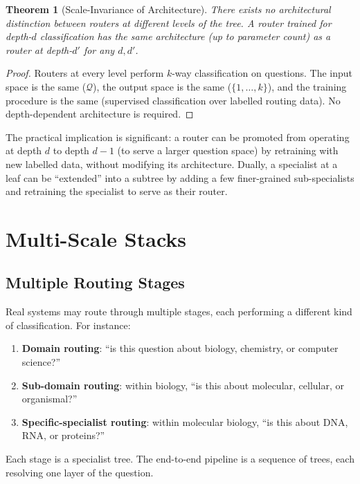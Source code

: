 \documentclass[11pt,twocolumn,a4paper]{article}
\newtheorem{theorem}{Theorem}[section]
\theoremstyle{definition}
\theoremstyle{remark}
\newcommand{\Qc}{\mathcal{Q}}
\begin{document}
\begin{theorem}[Scale-Invariance of Architecture]
\label{thm:scale-inv}
There exists no architectural distinction between routers at different levels of the tree. A router trained for depth-$d$ classification has the same architecture (up to parameter count) as a router at depth-$d'$ for any $d, d'$.
\end{theorem}

\begin{proof}
Routers at every level perform $k$-way classification on questions. The input space is the same ($\Qc$), the output space is the same ($\{1, \ldots, k\}$), and the training procedure is the same (supervised classification over labelled routing data). No depth-dependent architecture is required.
\end{proof}

The practical implication is significant: a router can be promoted from operating at depth $d$ to depth $d-1$ (to serve a larger question space) by retraining with new labelled data, without modifying its architecture. Dually, a specialist at a leaf can be ``extended'' into a subtree by adding a few finer-grained sub-specialists and retraining the specialist to serve as their router.

\section{Multi-Scale Stacks}
\label{sec:multi-scale}

\subsection{Multiple Routing Stages}

Real systems may route through multiple stages, each performing a different kind of classification. For instance:
\begin{enumerate}
    \item \textbf{Domain routing}: ``is this question about biology, chemistry, or computer science?''
    \item \textbf{Sub-domain routing}: within biology, ``is this about molecular, cellular, or organismal?''
    \item \textbf{Specific-specialist routing}: within molecular biology, ``is this about DNA, RNA, or proteins?''
\end{enumerate}

Each stage is a specialist tree. The end-to-end pipeline is a sequence of trees, each resolving one layer of the question.
\end{document}
